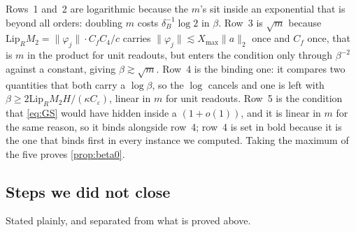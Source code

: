 \documentclass[11pt]{article}
\theoremstyle{definition}
\theoremstyle{remark}
\begin{document}
Rows~1 and~2 are logarithmic because the $m$'s sit inside an exponential that is
beyond all orders: doubling $m$ costs $\delta_B^{-1}\log2$ in $\beta$. Row~3 is
$\sqrt m$ because $\mathrm{Lip}_RM_2=\|\varphi_j\|\cdot C_fC_4/c$ carries
$\|\varphi_j\|\lesssim X_{\max}\|a\|_2$ once and $C_f$ once, that is $m$ in the
product for unit readouts, but enters the condition only through $\beta^{-2}$
against a constant, giving $\beta\gtrsim\sqrt m$. Row~4 is the binding one: it
compares two quantities that both carry a $\log\beta$, so the $\log$ cancels and
one is left with $\beta\ge2\mathrm{Lip}_RM_2H/(\kappa C_\varepsilon)$, linear in
$m$ for unit readouts. Row~5 is the condition that \eqref{eq:GS} would have
hidden inside a $(1+o(1))$, and it is linear in $m$ for the same reason, so it
binds alongside row~4; row~4 is set in bold because it is the one that binds
first in every instance we computed. Taking
the maximum of the five proves \cref{prop:beta0}.

\subsection{Steps we did not close}\label{app:forcing-open}

Stated plainly, and separated from what is proved above.
\end{document}
